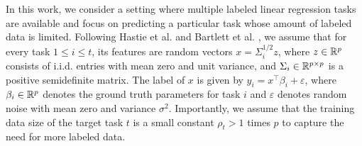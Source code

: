 

In this work, we consider a setting where multiple labeled linear regression tasks are available and focus on predicting a particular task whose amount of labeled data is limited.
Following Hastie et al. \cite{HMRT19} and Bartlett et al. \cite{BLLT20}, we assume that for every task $1\le i\le t$, its features are random vectors $x = \Sigma_i^{1/2}z$, where $z\in\mathbb{R}^p$ consists of i.i.d. entries with mean zero and unit variance, and $\Sigma_i\in\mathbb{R}^{p\times p}$ is a positive semidefinite matrix.
The label of $x$ is given by $y_i = x^{\top}\beta_i + \varepsilon$, where $\beta_i\in\mathbb{R}^p$ denotes the ground truth parameters for task $i$ and $\varepsilon$ denotes random noise with mean zero and variance $\sigma^2$.
Importantly, we assume that the training data size of the target task $t$ is a small constant $\rho_t > 1$ times $p$ to capture the need for more labeled data.

